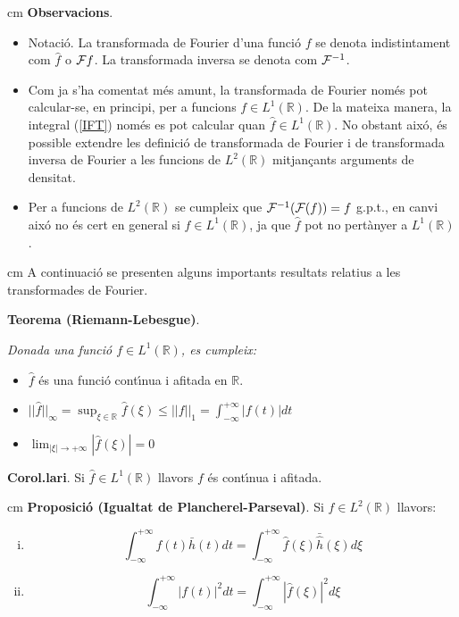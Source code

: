 \documentclass{article}
\def\R{\mathbb R}
\begin{document}
 cm
\noindent
\textbf{Observacions}. 
\begin{itemize}
\item Notaci\'o. La transformada de Fourier d'una funci\'o $f$ se denota 
indistintament com $\hat{f}$ o ${\cal F} f$. La transformada inversa se
denota com ${\cal F}^{-1}$.
\item Com ja s'ha comentat m\'es amunt, la transformada de Fourier 
nom\'es pot calcular-se, en principi, per a funcions $f \in L^1(\R)$.
De la mateixa manera, la integral (\ref{IFT}) nom\'es es pot calcular
quan $\hat{f} \in L^1(\R)$.
No obstant aix\'o, \'es possible extendre les definici\'o de transformada
de Fourier i de transformada inversa de Fourier a les funcions de $L^2(\R)$
mitjan\c{c}ants arguments de densitat. 
\item Per a funcions de
$L^2(\R)$ se cumpleix que ${\cal F}^{-1}({\cal F}(f))=f$ g.p.t., en canvi aix\'o no
\'es cert en general si $f \in L^1(\R)$, ja que $\hat{f}$ pot no pert\`anyer a 
$L^1(\R)$.
\end{itemize}

 cm
A continuaci\'o se presenten alguns importants resultats relatius a les
transformades de Fourier.

\noindent
\textbf{Teorema (Riemann-Lebesgue)}.{\it 
Donada una funci\'o $f \in L^1(\R)$, es cumpleix:
\begin{itemize}
\item $\hat{f}$ \'es una funci\'o cont\'\i nua i afitada en $\R$.
\item $||\hat{f}||_{\infty}=\sup_{\xi \in \R} \hat{f}(\xi) \leq 
||f||_1=\int_{-\infty}^{+\infty} |f(t)| dt$
\item $\lim_{|\xi| \rightarrow +\infty} |\hat{f}(\xi)|=0$
\end{itemize}
}

\noindent
\textbf{Corol.lari}. Si $\hat{f} \in L^1(\R)$ llavors $f$ \'es cont\'\i nua i afitada.

 cm
\noindent
\textbf{Proposici\'o (Igualtat de Plancherel-Parseval)}.
Si $f \in L^2(\R)$ llavors:
\begin{enumerate}[i)]
\item 
\begin{equation}
\label{eq7}
\int_{-\infty}^{+\infty} f(t) \bar{h}(t) dt = \int_{-\infty}^{+\infty} \hat{f}(\xi)
\bar{\hat{h}}(\xi) d\xi
\end{equation}
\item 
\begin{equation}
\label{eq8}
\int_{-\infty}^{+\infty} |f(t)|^2 dt = \int_{-\infty}^{+\infty} |\hat{f}(\xi)|^2 d\xi
\end{equation}
\end{enumerate}
\end{document}
